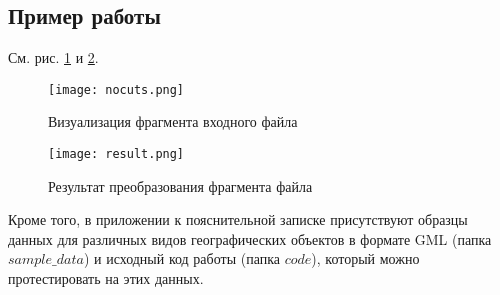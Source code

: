 \subsection{Пример работы}
\label{}

См. рис. \ref{fig:nocuts} и \ref{fig:result}.

\begin{figure}[!htb]
    \centering
    \texttt{[image: nocuts.png]}
    \caption{Визуализация фрагмента входного файла}
    \label{fig:nocuts}
\end{figure}

\begin{figure}[!htb]
    \centering
    \texttt{[image: result.png]}
    \caption{Результат преобразования фрагмента файла}
    \label{fig:result}
\end{figure}

Кроме того, в приложении к пояснительной записке присутствуют образцы данных для различных видов географических объектов в формате GML (папка $sample\_data$) и исходный код работы (папка $code$), который можно протестировать на этих данных.